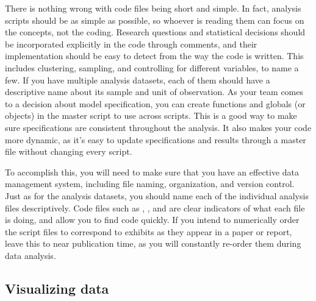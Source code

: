 There is nothing wrong with code files being short and simple.
In fact, analysis scripts should be as simple as possible,
so whoever is reading them can focus on the concepts, not the coding.
Research questions and statistical decisions should be incorporated explicitly in the code through comments,
and their implementation should be easy to detect from the way the code is written.
This includes clustering, sampling, and controlling for different variables, to name a few.
If you have multiple analysis datasets,
each of them should have a descriptive name about its sample and unit of observation.
As your team comes to a decision about model specification,
you can create functions and globals (or objects) in the master script to use across scripts.
This is a good way to make sure specifications are consistent throughout the analysis.
It also makes your code more dynamic,
as it's easy to update specifications and results
through a master file without changing every script.


To accomplish this, you will need to make sure that you have an effective data management system,
including file naming, organization, and version control.
Just as for the analysis datasets,
you should name each of the individual analysis files descriptively.
Code files such as ,
, and 
are clear indicators of what each file is doing, and allow you to find code quickly.
If you intend to numerically order the script files
to correspond to exhibits as they appear in a paper or report,
leave this to near publication time,
as you will constantly re-order them during data analysis.

\subsection{Visualizing data}

